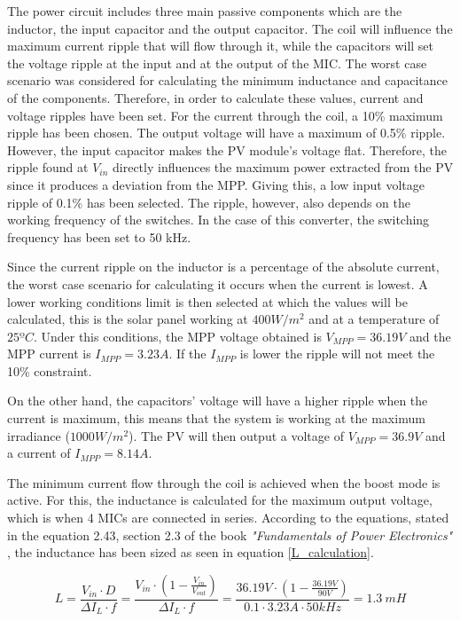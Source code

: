 The power circuit includes three main passive components which are the inductor, the input capacitor and the output capacitor. The coil will influence the maximum current ripple that will flow through it, while the capacitors will set the voltage ripple at the input and at the output of the MIC. The worst case scenario was considered for calculating the minimum inductance and capacitance of the components.
\label{sec:componentsizing}
Therefore, in order to calculate these values, current and voltage ripples have been set. For the current through the coil, a 10\% maximum ripple has been chosen. The output voltage will  have a maximum of 0.5\% ripple. However, the input capacitor makes the PV module's voltage flat. Therefore, the ripple found at $V_{in}$ directly influences the maximum power extracted from the PV since it produces a deviation from the MPP. Giving this, a low input voltage ripple of 0.1\% has been selected. The ripple, however, also depends on the working frequency of the switches. In the case of this converter, the switching frequency has been set to 50 kHz. 

Since the current ripple on the inductor is a percentage of the absolute current, the worst case scenario for calculating it occurs when the current is lowest. A lower working conditions limit is then selected at which the values will be calculated, this is the solar panel working at $400 W/m^2$ and at a temperature of $25 ºC$. Under this conditions, the MPP voltage obtained is $V_{MPP} = 36.19 V$ and the MPP current is $I_{MPP} = 3.23A$. If the $I_{MPP}$ is lower the ripple will not meet the 10\% constraint.

On the other hand, the capacitors' voltage will have a higher ripple when the current is maximum, this means that the system is working at the maximum irradiance ($1000 W/m^2$). The PV will then output a voltage of $V_{MPP} = 36.9 V$ and a current of $I_{MPP} = 8.14 A$.

The minimum current flow through the coil is achieved when the boost mode is active. For this, the inductance is calculated for the maximum output voltage, which is when 4 MICs are connected in series. According to the equations, stated in the equation 2.43, section 2.3 of the book \textit{"Fundamentals of Power Electronics"} \cite{Erickson}, the inductance has been sized as seen in equation \ref{L_calculation}.

\begin{equation} \label{L_calculation}
L = \frac{V_{in} \cdot D}{\Delta I_{L} \cdot f} = \frac{V_{in} \cdot (1 -  \frac{V_{in}}{V_{out}})}{\Delta I_{L} \cdot f} =  \frac{36.19 V \cdot (1-\frac{36.19V}{90V})}{0.1 \cdot 3.23 A \cdot 50 kHz} = 1.3 \ mH
\end{equation}

